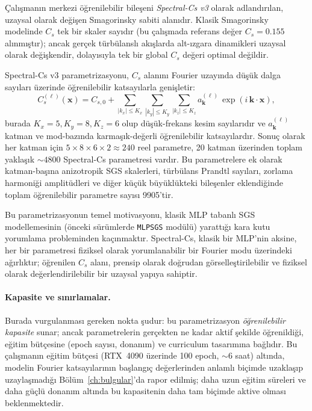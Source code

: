 Çalışmanın merkezi öğrenilebilir bileşeni \emph{Spectral-Cs v3} olarak adlandırılan, uzaysal olarak değişen Smagorinsky sabiti alanıdır. Klasik Smagorinsky modelinde $C_{s}$ tek bir skaler sayıdır (bu çalışmada referans değer $C_{s}=0.155$ alınmıştır); ancak gerçek türbülanslı akışlarda alt-ızgara dinamikleri uzaysal olarak değişkendir, dolayısıyla tek bir global $C_{s}$ değeri optimal değildir.

Spectral-Cs v3 parametrizasyonu, $C_{s}$ alanını Fourier uzayında düşük dalga sayıları üzerinde öğrenilebilir katsayılarla genişletir:
\begin{equation}
C_{s}^{(\ell)}(\mathbf{x}) = C_{s,0} + \sum_{|k_{x}|\leq K_{x}}\sum_{|k_{y}|\leq K_{y}}\sum_{|k_{z}|\leq K_{z}} a^{(\ell)}_{\mathbf{k}}\,\exp(i\,\mathbf{k}\cdot\mathbf{x}),
\label{eq:spectral_cs}
\end{equation}
burada $K_{x}=5, K_{y}=8, K_{z}=6$ olup düşük-frekans kesim sayılarıdır ve $a^{(\ell)}_{\mathbf{k}}$ katman ve mod-bazında karmaşık-değerli öğrenilebilir katsayılardır. Sonuç olarak her katman için $5\times 8\times 6 \times 2 \approx 240$ reel parametre, 20 katman üzerinden toplam yaklaşık $\sim 4800$ Spectral-Cs parametresi vardır. Bu parametrelere ek olarak katman-başına anizotropik SGS skalerleri, türbülans Prandtl sayıları, zorlama harmoniği amplitüdleri ve diğer küçük büyüklükteki bileşenler eklendiğinde toplam öğrenilebilir parametre sayısı 9905'tir.

Bu parametrizasyonun temel motivasyonu, klasik MLP tabanlı SGS modellemesinin (önceki sürümlerde \texttt{MLPSGS} modülü) yarattığı kara kutu yorumlama probleminden kaçınmaktır. Spectral-Cs, klasik bir MLP'nin aksine, her bir parametresi fiziksel olarak yorumlanabilir bir Fourier modu üzerindeki ağırlıktır; öğrenilen $C_{s}$ alanı, prensip olarak doğrudan görselleştirilebilir ve fiziksel olarak değerlendirilebilir bir uzaysal yapıya sahiptir.

\paragraph{Kapasite ve sınırlamalar.} Burada vurgulanması gereken nokta şudur: bu parametrizasyon \emph{öğrenilebilir kapasite} sunar; ancak parametrelerin gerçekten ne kadar aktif şekilde öğrenildiği, eğitim bütçesine (epoch sayısı, donanım) ve curriculum tasarımına bağlıdır. Bu çalışmanın eğitim bütçesi (RTX~4090 üzerinde 100 epoch, $\sim 6$ saat) altında, modelin Fourier katsayılarının başlangıç değerlerinden anlamlı biçimde uzaklaşıp uzaylaşmadığı Bölüm~\ref{ch:bulgular}'da rapor edilmiş; daha uzun eğitim süreleri ve daha güçlü donanım altında bu kapasitenin daha tam biçimde aktive olması beklenmektedir.

